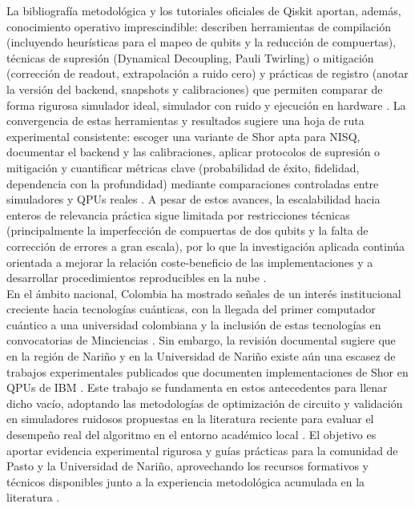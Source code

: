 \documentclass[12pt, spanish]{book}
\begin{document}
La bibliografía metodológica y los tutoriales oficiales de Qiskit aportan, además, conocimiento operativo imprescindible: describen herramientas de compilación (incluyendo heurísticas para el mapeo de qubits y la reducción de compuertas), técnicas de supresión (Dynamical Decoupling, Pauli Twirling) o mitigación (corrección de readout, extrapolación a ruido cero) y prácticas de registro (anotar la versión del backend, snapshots y calibraciones) que permiten comparar de forma rigurosa simulador ideal, simulador con ruido y ejecución en hardware \cite{DeCusatis2021, IBM,IBMqiskit}. La convergencia de estas herramientas y resultados sugiere una hoja de ruta experimental consistente: escoger una variante de Shor apta para NISQ, documentar el backend y las calibraciones, aplicar protocolos de supresión o mitigación y cuantificar métricas clave (probabilidad de éxito, fidelidad, dependencia con la profundidad) mediante comparaciones controladas entre simuladores y QPUs reales \cite{Rossi2022,DeCusatis2021,Roffe2019}. A pesar de estos avances, la escalabilidad hacia enteros de relevancia práctica sigue limitada por restricciones técnicas (principalmente la imperfección de compuertas de dos qubits y la falta de corrección de errores a gran escala), por lo que la investigación aplicada continúa orientada a mejorar la relación coste-beneficio de las implementaciones y a desarrollar procedimientos reproducibles en la nube \cite{Roffe2019,Vandersypen2001,Rossi2022}.\\

En el ámbito nacional, Colombia ha mostrado señales de un interés institucional creciente hacia tecnologías cuánticas, con la llegada del primer computador cuántico a una universidad colombiana \cite{UniversidaddelosAndes2024} y la inclusión de estas tecnologías en convocatorias de Minciencias \cite{MinisteriodeCienciasdeColombia2025,FundacionAlejandroAngelEscobar2020}. Sin embargo, la revisión documental sugiere que en la región de Nariño y en la Universidad de Nariño existe aún una escasez de trabajos experimentales publicados que documenten implementaciones de Shor en QPUs de IBM \cite{udenar}. Este trabajo se fundamenta en estos antecedentes para llenar dicho vacío, adoptando las metodologías de optimización de circuito y validación en simuladores ruidosos propuestas en la literatura reciente para evaluar el desempeño real del algoritmo en el entorno académico local \cite{villarreal, udenar}. El objetivo es aportar evidencia experimental rigurosa y guías prácticas para la comunidad de Pasto y la Universidad de Nariño, aprovechando los recursos formativos y técnicos disponibles junto a la experiencia metodológica acumulada en la literatura \cite{IBMqiskit,Saxena2021}.
\end{document}
